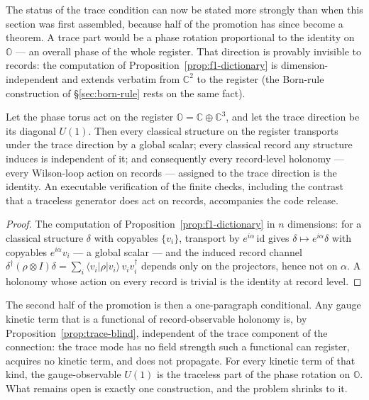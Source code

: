 The status of the trace condition can now be stated more strongly than when this section was first
assembled, because half of the promotion has since become a theorem. A trace part would be a phase
rotation proportional to the identity on $\mathbb{O}$ --- an overall phase of the whole register.
That direction is provably invisible to records: the computation of
Proposition~\ref{prop:f1-dictionary} is dimension-independent and extends verbatim from
$\mathbb{C}^{2}$ to the register (the Born-rule construction of \S\ref{sec:born-rule} rests
on the same fact).

\begin{proposition}\label{prop:trace-blind}
Let the phase torus act on the register $\mathbb{O} = \mathbb{C}\oplus\mathbb{C}^{3}$, and let
the trace direction be its diagonal $U(1)$. Then every classical structure on the register
transports under the trace direction by a global scalar; every classical record any structure
induces is independent of it; and consequently every record-level holonomy --- every Wilson-loop
action on records --- assigned to the trace direction is the identity. An executable verification
of the finite checks, including the contrast that a traceless generator does act on records,
accompanies the code release.
\end{proposition}

\begin{proof}
The computation of Proposition~\ref{prop:f1-dictionary} in $n$ dimensions: for a classical
structure $\delta$ with copyables $\{v_{i}\}$, transport by $e^{i\alpha}\,\mathrm{id}$ gives
$\delta \mapsto e^{i\alpha}\delta$ with copyables $e^{i\alpha}v_{i}$ --- a global scalar ---
and the induced record channel
$\delta^{\dagger}(\rho\otimes I)\delta = \sum_{i}\langle v_{i}|\rho|v_{i}\rangle\,
v_{i}v_{i}^{\dagger}$ depends only on the projectors, hence not on $\alpha$. A holonomy whose
action on every record is trivial is the identity at record level.
\end{proof}

The second half of the promotion is then a one-paragraph conditional. Any gauge kinetic term that
is a functional of record-observable holonomy is, by Proposition~\ref{prop:trace-blind},
independent of the trace component of the connection: the trace mode has no field strength such a
functional can register, acquires no kinetic term, and does not propagate. For every kinetic term
of that kind, the gauge-observable $U(1)$ is the traceless part of the phase rotation on
$\mathbb{O}$. What remains open is exactly one construction, and the problem shrinks to it.

